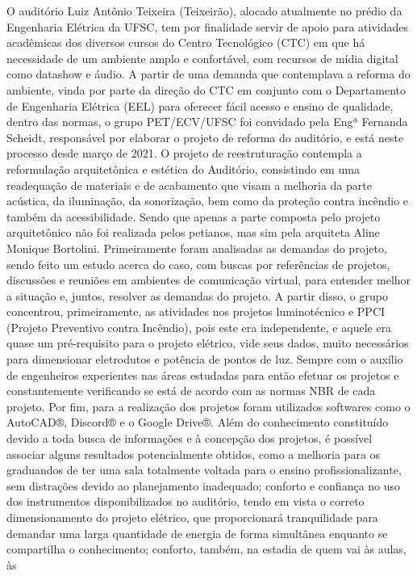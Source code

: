 O auditório Luiz Antônio Teixeira (Teixeirão), alocado atualmente no prédio da
Engenharia Elétrica da UFSC, tem por finalidade servir de apoio para atividades acadêmicas dos
diversos cursos do Centro Tecnológico (CTC) em que há necessidade de um ambiente amplo e
confortável, com recursos de mídia digital como datashow e áudio.
A partir de uma demanda que contemplava a reforma do ambiente, vinda por parte da
direção do CTC em conjunto com o Departamento de Engenharia Elétrica (EEL) para oferecer
fácil acesso e ensino de qualidade, dentro das normas, o grupo PET/ECV/UFSC foi convidado
pela Engª Fernanda Scheidt, responsável por elaborar o projeto de reforma do auditório, e está
neste processo desde março de 2021.
O projeto de reestruturação contempla a reformulação arquitetônica e estética do
Auditório, consistindo em uma readequação de materiais e de acabamento que visam a melhoria
da parte acústica, da iluminação, da sonorização, bem como da proteção contra incêndio e
também da acessibilidade. Sendo que apenas a parte composta pelo projeto arquitetônico não foi
realizada pelos petianos, mas sim pela arquiteta Aline Monique Bortolini.
Primeiramente foram analisadas as demandas do projeto, sendo feito um estudo acerca do
caso, com buscas por referências de projetos, discussões e reuniões em ambientes de
comunicação virtual, para entender melhor a situação e, juntos, resolver as demandas do projeto.
A partir disso, o grupo concentrou, primeiramente, as atividades nos projetos luminotécnico e
PPCI (Projeto Preventivo contra Incêndio), pois este era independente, e aquele era quase um
pré-requisito para o projeto elétrico, vide seus dados, muito necessários para dimensionar
eletrodutos e potência de pontos de luz. Sempre com o auxílio de engenheiros experientes nas
áreas estudadas para então efetuar os projetos e constantemente verificando se está de acordo
com as normas NBR de cada projeto. Por fim, para a realização dos projetos foram utilizados
softwares como o AutoCAD®, Discord® e o Google Drive®.
Além do conhecimento constituído devido a toda busca de informações e à concepção
dos projetos, é possível associar alguns resultados potencialmente obtidos, como a melhoria para
os graduandos de ter uma sala totalmente voltada para o ensino profissionalizante, sem
distrações devido ao planejamento inadequado; conforto e confiança no uso dos instrumentos
disponibilizados no auditório, tendo em vista o correto dimensionamento do projeto elétrico, que
proporcionará tranquilidade para demandar uma larga quantidade de energia de forma simultânea
enquanto se compartilha o conhecimento; conforto, também, na estadia de quem vai às aulas, às
